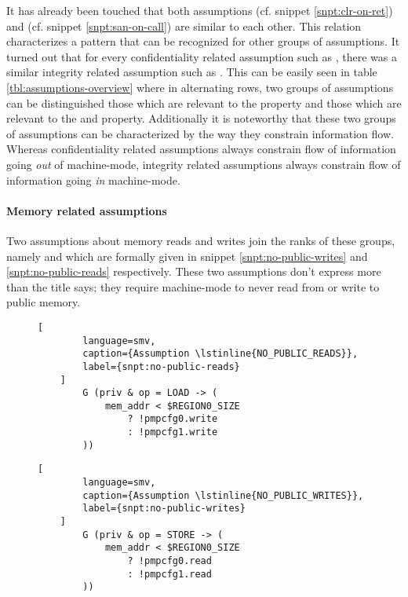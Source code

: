 It has already been touched that both assumptions  (cf. snippet \ref{snpt:clr-on-ret}) and  (cf. snippet \ref{snpt:san-on-call}) are similar to each other.
This relation characterizes a pattern that can be recognized for other groups of assumptions.
It turned out that for every confidentiality related assumption such as , there was a similar integrity related assumption such as .
This can be easily seen in table \ref{tbl:assumptions-overview} where in alternating rows, two groups of assumptions can be distinguished those which are relevant to the  property and those which are relevant to the  and  property.
Additionally it is noteworthy that these two groups of assumptions can be characterized by the way they constrain information flow.
Whereas confidentiality related assumptions always constrain flow of information going \textit{out} of machine-mode, integrity related assumptions always constrain flow of information going \textit{in} machine-mode.

\paragraph{Memory related assumptions}
Two assumptions about memory reads and writes join the ranks of these groups, namely  and  which are formally given in snippet \ref{snpt:no-public-writes} and \ref{snpt:no-public-reads} respectively.
These two assumptions don't express more than the title says; they require machine-mode to never read from or write to public memory.

\begin{figure}
    \begin{lstlisting}[
        language=smv,
        caption={Assumption \lstinline{NO_PUBLIC_READS}},
        label={snpt:no-public-reads}
    ]
        G (priv & op = LOAD -> (
            mem_addr < $REGION0_SIZE
                ? !pmpcfg0.write
                : !pmpcfg1.write
        ))
    \end{lstlisting}

    \begin{lstlisting}[
        language=smv,
        caption={Assumption \lstinline{NO_PUBLIC_WRITES}},
        label={snpt:no-public-writes}
    ]
        G (priv & op = STORE -> (
            mem_addr < $REGION0_SIZE
                ? !pmpcfg0.read
                : !pmpcfg1.read
        ))
    \end{lstlisting}
\end{figure}


